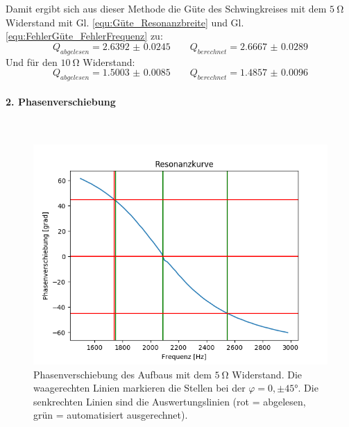 \documentclass[12pt,a4paper]{article}
\begin{document}
Damit ergibt sich aus dieser Methode die Güte des Schwingkreises mit dem $\SI{5}{\ohm}$ Widerstand mit Gl. \ref{equ:Güte_Resonanzbreite} und Gl. \ref{equ:FehlerGüte_FehlerFrequenz} zu:
\begin{equation*}
Q_{abgelesen} = \num{2.6392(245)} \qquad Q_{berechnet} = \num{2.6667(289)}
\end{equation*}
Und für den $\SI{10}{\ohm}$ Widerstand:
\begin{equation*}
Q_{abgelesen} = \num{1.5003(85)} \qquad Q_{berechnet} = \num{1.4857(96)}
\end{equation*}

\paragraph{2. Phasenverschiebung}\mbox{}\\
\begin{figure}
\centering
\includegraphics[scale=0.8]{Bilder/Serie_Phasenverschiebung_A_5.png}
\caption{Phasenverschiebung des Aufbaus mit dem $\SI{5}{\ohm}$ Widerstand. Die waagerechten Linien markieren die Stellen bei der $\varphi = 0, \pm \ang{45}$. Die senkrechten Linien sind die Auswertungslinien (rot = abgelesen, grün = automatisiert ausgerechnet).}
\label{fig:Serie_Phasenverschiebung_A_5}
\end{figure}
\end{document}
